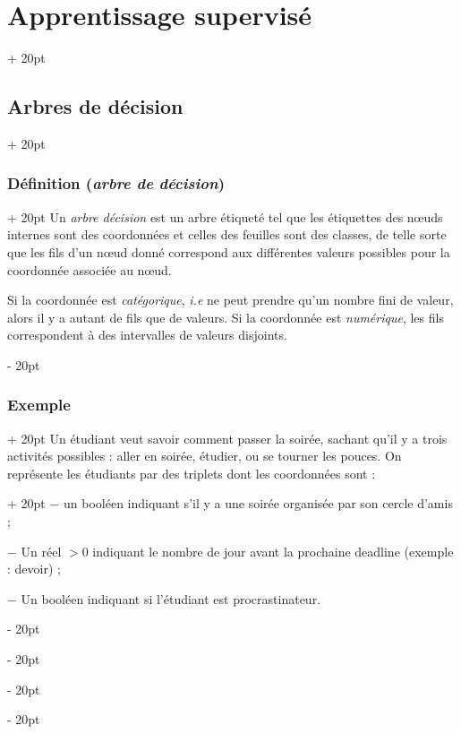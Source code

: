 \documentclass[a4paper, 12pt, twoside]{article}
\newcommand{\ind}[1][20pt]{\advance\leftskip + #1}
\newcommand{\deind}[1][20pt]{\advance\leftskip - #1}
\newenvironment{indt}[2][20pt]{#2 \par \ind[#1]}{\par \deind} %
\begin{document}
\begin{indt}{\section{Apprentissage supervisé}}
\begin{indt}{\subsection{Arbres de décision}}
            \begin{indt}{\subsubsection{Définition (\textit{arbre de décision})}}
                Un \emph{arbre décision} est un arbre étiqueté tel que les étiquettes des n\oe uds internes sont des coordonnées et celles des feuilles sont des classes, de telle sorte que les fils d'un n\oe ud donné correspond aux différentes valeurs possibles pour la coordonnée associée au n\oe ud.

                Si la coordonnée est \emph{catégorique}, \textit{i.e} ne peut prendre qu'un nombre fini de valeur, alors il y a autant de fils que de valeurs.
                Si la coordonnée est \emph{numérique}, les fils correspondent à des intervalles de valeurs disjoints.
            \end{indt}

            \vspace{12pt}
            
            \begin{indt}{\subsubsection{Exemple}}
                Un étudiant veut savoir comment passer la soirée, sachant qu'il y a trois activités possibles : aller en soirée, étudier, ou se tourner les pouces.
                \begin{indt}{On représente les étudiants par des triplets dont les coordonnées sont :}
                    $-$ un booléen indiquant s'il y a une soirée organisée par son cercle d'amis ;

                    $-$ Un réel $> 0$ indiquant le nombre de jour avant la prochaine deadline (exemple : devoir) ;

                    $-$ Un booléen indiquant si l'étudiant est procrastinateur.
                \end{indt}


\end{indt}
\end{indt}
\end{indt}
\end{document}
